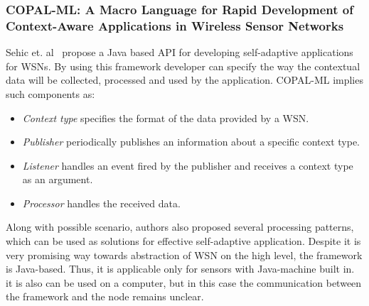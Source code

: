 \subsubsection*{COPAL-ML: A Macro Language for Rapid Development of Context-Aware
Applications in Wireless Sensor Networks}

Sehic et. al~\cite{sehic11} propose a Java based API for developing self-adaptive
applications for WSNs. By using this framework developer can specify the way the
contextual data will be collected, processed and used by the application.
COPAL-ML implies such components as:

\begin{itemize}
\item \emph{Context type} specifies the format of the data provided by a WSN.
\item \emph{Publisher} periodically publishes an information about a specific
context type.
\item \emph{Listener} handles an event fired by the publisher and receives a
context type as an argument.
\item \emph{Processor} handles the received data.
\end{itemize}

Along with possible scenario, authors also proposed several processing patterns,
which can be used as solutions for effective self-adaptive application. Despite it
is very promising way towards abstraction of WSN on the high level, the
framework is Java-based. Thus, it is applicable only for sensors with
Java-machine built in. it is also can be used on a computer, but in this case the
communication between the framework and the node remains unclear.

